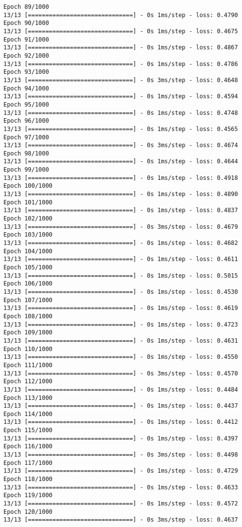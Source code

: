 \documentclass[11pt]{article}
\begin{document}
\begin{Verbatim}[commandchars=\\\{\}]
Epoch 89/1000
13/13 [==============================] - 0s 1ms/step - loss: 0.4790
Epoch 90/1000
13/13 [==============================] - 0s 1ms/step - loss: 0.4675
Epoch 91/1000
13/13 [==============================] - 0s 1ms/step - loss: 0.4867
Epoch 92/1000
13/13 [==============================] - 0s 1ms/step - loss: 0.4786
Epoch 93/1000
13/13 [==============================] - 0s 3ms/step - loss: 0.4648
Epoch 94/1000
13/13 [==============================] - 0s 1ms/step - loss: 0.4594
Epoch 95/1000
13/13 [==============================] - 0s 1ms/step - loss: 0.4748
Epoch 96/1000
13/13 [==============================] - 0s 1ms/step - loss: 0.4565
Epoch 97/1000
13/13 [==============================] - 0s 3ms/step - loss: 0.4674
Epoch 98/1000
13/13 [==============================] - 0s 1ms/step - loss: 0.4644
Epoch 99/1000
13/13 [==============================] - 0s 1ms/step - loss: 0.4918
Epoch 100/1000
13/13 [==============================] - 0s 1ms/step - loss: 0.4890
Epoch 101/1000
13/13 [==============================] - 0s 1ms/step - loss: 0.4837
Epoch 102/1000
13/13 [==============================] - 0s 3ms/step - loss: 0.4679
Epoch 103/1000
13/13 [==============================] - 0s 1ms/step - loss: 0.4682
Epoch 104/1000
13/13 [==============================] - 0s 1ms/step - loss: 0.4611
Epoch 105/1000
13/13 [==============================] - 0s 1ms/step - loss: 0.5015
Epoch 106/1000
13/13 [==============================] - 0s 1ms/step - loss: 0.4530
Epoch 107/1000
13/13 [==============================] - 0s 1ms/step - loss: 0.4619
Epoch 108/1000
13/13 [==============================] - 0s 1ms/step - loss: 0.4723
Epoch 109/1000
13/13 [==============================] - 0s 1ms/step - loss: 0.4631
Epoch 110/1000
13/13 [==============================] - 0s 1ms/step - loss: 0.4550
Epoch 111/1000
13/13 [==============================] - 0s 3ms/step - loss: 0.4570
Epoch 112/1000
13/13 [==============================] - 0s 1ms/step - loss: 0.4484
Epoch 113/1000
13/13 [==============================] - 0s 1ms/step - loss: 0.4437
Epoch 114/1000
13/13 [==============================] - 0s 1ms/step - loss: 0.4412
Epoch 115/1000
13/13 [==============================] - 0s 1ms/step - loss: 0.4397
Epoch 116/1000
13/13 [==============================] - 0s 3ms/step - loss: 0.4498
Epoch 117/1000
13/13 [==============================] - 0s 1ms/step - loss: 0.4729
Epoch 118/1000
13/13 [==============================] - 0s 1ms/step - loss: 0.4633
Epoch 119/1000
13/13 [==============================] - 0s 1ms/step - loss: 0.4572
Epoch 120/1000
13/13 [==============================] - 0s 3ms/step - loss: 0.4637

\end{Verbatim}
\end{document}
